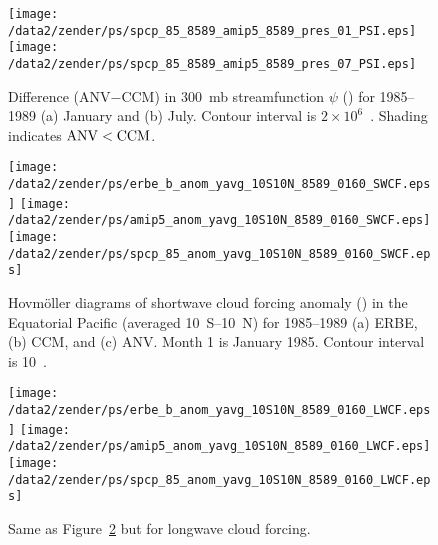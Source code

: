 \documentclass[twocolumn,final]{article}
\begin{document}
\begin{figure}
\begin{center}
\texttt{[image: /data2/zender/ps/spcp\_85\_8589\_amip5\_8589\_pres\_01\_PSI.eps]}\vfill
\texttt{[image: /data2/zender/ps/spcp\_85\_8589\_amip5\_8589\_pres\_07\_PSI.eps]}\vfill
\end{center}
\caption[Difference (ANV$-$CCM) in 300~mb streamfunction $\psi$
for 1985--1989 January and July]{
Difference (ANV$-$CCM) in 300~mb streamfunction $\psi$ (\mSxs)
for 1985--1989 (a) January and (b) July.
Contour interval is $2 \times 10^6$~\mSxs. 
Shading indicates $\mbox{\textrm{ANV}} < \mbox{\textrm{CCM}}$.
\label{fig:pres_8589_PSI}}
\end{figure}
\clearpage

\begin{figure}
\begin{center}
\texttt{[image: /data2/zender/ps/erbe\_b\_anom\_yavg\_10S10N\_8589\_0160\_SWCF.eps]}\vfill
\texttt{[image: /data2/zender/ps/amip5\_anom\_yavg\_10S10N\_8589\_0160\_SWCF.eps]}\vfill
\texttt{[image: /data2/zender/ps/spcp\_85\_anom\_yavg\_10S10N\_8589\_0160\_SWCF.eps]}\vfill
\end{center}
\caption[Hovm\"oller diagrams of shortwave cloud forcing 
anomaly in the Equatorial Pacific for 1985--1989 ERBE, CCM, and ANV]{ 
Hovm\"oller diagrams of shortwave cloud forcing anomaly (\wxmS) in the
Equatorial Pacific (averaged 10~\degreee S--10~\degreee N) for
1985--1989 (a) ERBE, (b) CCM, and (c) ANV.  
Month 1 is January 1985.  
Contour interval is 10~\wxmS. 
\label{fig:anom_yavg_10S10N_8589_0160_SWCF}}
\end{figure}

\begin{figure}
\begin{center}
\texttt{[image: /data2/zender/ps/erbe\_b\_anom\_yavg\_10S10N\_8589\_0160\_LWCF.eps]}\vfill
\texttt{[image: /data2/zender/ps/amip5\_anom\_yavg\_10S10N\_8589\_0160\_LWCF.eps]}\vfill
\texttt{[image: /data2/zender/ps/spcp\_85\_anom\_yavg\_10S10N\_8589\_0160\_LWCF.eps]}\vfill
\end{center}
\caption{Same as Figure~\ref{fig:anom_yavg_10S10N_8589_0160_SWCF} but
for longwave cloud forcing.
\label{fig:anom_yavg_10S10N_8589_0160_LWCF}}
\end{figure}
\clearpage
\end{document}
